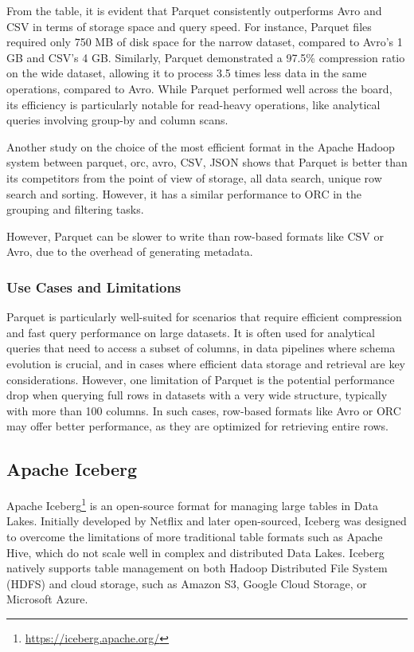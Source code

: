 From the table, it is evident that Parquet consistently outperforms Avro and \ac{CSV} in terms of storage space and query speed. For instance, Parquet files required only 750 MB of disk space for the narrow dataset, compared to Avro's 1 GB and \ac{CSV}'s 4 GB. Similarly, Parquet demonstrated a 97.5\% compression ratio on the wide dataset, allowing it to process 3.5 times less data in the same operations, compared to Avro. While Parquet performed well across the board, its efficiency is particularly notable for read-heavy operations, like analytical queries involving group-by and column scans.

Another study on the choice of the most efficient format in the Apache Hadoop system between parquet, orc, avro, \ac{CSV}, \ac{JSON} \cite{sym13020195} shows that Parquet is better than its competitors from the point of view of storage, all data search, unique row search and sorting. However, it has a similar performance to ORC in the grouping and filtering tasks.

However, Parquet can be slower to write than row-based formats like \ac{CSV} or Avro, due to the overhead of generating metadata.

\subsubsection{Use Cases and Limitations}

Parquet is particularly well-suited for scenarios that require efficient compression and fast query performance on large datasets. It is often used for analytical queries that need to access a subset of columns, in data pipelines where schema evolution is crucial, and in cases where efficient data storage and retrieval are key considerations. However, one limitation of Parquet is the potential performance drop when querying full rows in datasets with a very wide structure, typically with more than 100 columns. In such cases, row-based formats like Avro or ORC may offer better performance, as they are optimized for retrieving entire rows.

\subsection{Apache Iceberg}
Apache Iceberg\footnote{\url{https://iceberg.apache.org/}} is an open-source format for managing large tables in Data Lakes. Initially developed by Netflix and later open-sourced, Iceberg was designed to overcome the limitations of more traditional table formats such as Apache Hive, which do not scale well in complex and distributed Data Lakes. Iceberg natively supports table management on both Hadoop Distributed File System (HDFS) and cloud storage, such as Amazon \ac{S3}, Google Cloud Storage, or Microsoft Azure.


